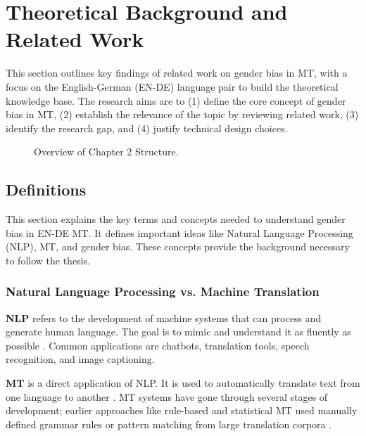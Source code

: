 \chapter{Theoretical Background and Related Work}
This section outlines key findings of related work on gender bias in MT, with a focus on the English-German (EN-DE) language pair to build the theoretical knowledge base. The research aims are to (1) define the core concept of gender bias in MT, (2) establish the relevance of the topic by reviewing related work, (3) identify the research gap, and (4) justify technical design choices. 

\vspace{1cm} 
\begin{figure}[htb]
    \centering
    \scalebox{0.8}{}
    \caption{Overview of Chapter 2 Structure.}
    \label{fig:workflow_theory}
\end{figure}
\vspace{1cm} 


\section{Definitions}
This section explains the key terms and concepts needed to understand gender bias in EN-DE MT. It defines important ideas like Natural Language Processing (NLP), MT, and gender bias. These concepts provide the background necessary to follow the thesis.

\subsection{Natural Language Processing vs. Machine Translation}
    \textbf{NLP} refers to the development of machine systems that can process and generate human language. The goal is to mimic and understand it as fluently as possible \parencite{smacchiaDoesAIReflect2024,ullmannGenderBiasMachine2022}. Common applications are chatbots, translation tools, speech recognition, and image captioning.

    \textbf{MT} is a direct application of NLP. It is used to automatically translate text from one language to another \parencite{linMachineTranslationAcademic2009}. MT systems have gone through several stages of development; earlier approaches like rule-based and statistical MT used manually defined grammar rules or pattern matching from large translation corpora \parencite{chakravarthiSurveyOrthographicInformation2021}. 

